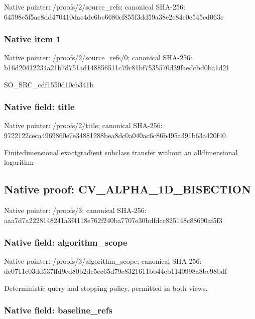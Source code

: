 \documentclass[10pt,a4paper]{article}
\begin{document}
Native pointer: /proofs/2/source\_refs; canonical SHA-256: 64598e5f5ac8dd470410dac4\allowbreak{}dc6be6680cf855f3dd59a38e\allowbreak{}2c84c0e545ed063c



\subsubsection{Native item 1}


Native pointer: /proofs/2/source\_refs/0; canonical SHA-256: b16d20412234a21b7d751ad1\allowbreak{}48856511c79c81bf7535570d\allowbreak{}39faedcbd0ba1d21


SO\_SRC\_cdf1550d10cb341b


\subsubsection{Native field: title}


Native pointer: /proofs/2/title; canonical SHA-256: 9722122ceca4969860e7e348\allowbreak{}81288bea8dc0a040ac6c86b4\allowbreak{}95a391b63a420f40


Finitedimensional exactgradient subclass transfer without an alldimensional logarithm


\subsection{Native proof: CV\_ALPHA\_1D\_BISECTION}


Native pointer: /proofs/3; canonical SHA-256: aaa7d7a2228148241a3f4118\allowbreak{}e762f240ba7707e30bdfdcc8\allowbreak{}25148c88690af5f3



\subsubsection{Native field: algorithm\_scope}


Native pointer: /proofs/3/algorithm\_scope; canonical SHA-256: de0711c03dd537ffd9ed80b2\allowbreak{}dc5ec65d79c8321611bb44eb\allowbreak{}1140998a8bc98bdf


Deterministic query and stopping policy, permitted in both views.


\subsubsection{Native field: baseline\_refs}
\end{document}
